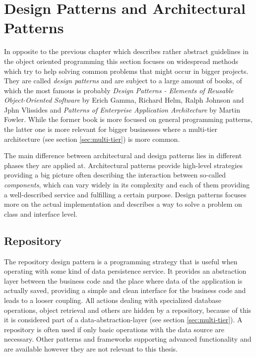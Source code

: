 \section{Design Patterns and Architectural Patterns}
In opposite to the previous chapter which describes rather abstract guidelines in the object oriented programming this section focuses on widespread methods which try to help solving common problems that might occur in bigger projects. They are called \emph{design patterns} and are subject to a large amount of books, of which the most famous is probably \emph{Design Patterns - Elements of Reusable Object-Oriented Software} by Erich Gamma, Richard Helm, Ralph Johnson and Jphn Vlissides and \emph{Patterns of Enterprise Application Architecture} by Martin Fowler. While the former book is more focused on general programming patterns, the latter one is more relevant for bigger businesses where a multi-tier architecture (see section \ref{sec:multi-tier}) is more common. 

The main difference between architectural and design patterns lies in different phases they are applied at. Architectural patterns provide high-level strategies providing a big picture often describing the interaction between so-called \emph{components}, which can vary widely in its complexity and each of them providing a well-described service and fulfilling a certain purpose. Design patterns focuses more on the actual implementation and describes a way to solve a problem on class and interface level. 

\subsection{Repository}
\label{sec:repository}
The repository design pattern is a programming strategy that is useful when operating with some kind of data persistence service. It provides an abstraction layer between the business code and the place where data of the application is actually saved, providing a simple and clean interface for the business code and leads to a looser coupling. All actions dealing with specialized database operations, object retrieval and others are hidden by a repository, because of this it is considered part of a data-abstraction-layer (see section \ref{sec:multi-tier}). A repository is often used if only basic operations with the data source are necessary. Other patterns and frameworks supporting advanced functionality and are available however they are not relevant to this thesis.

